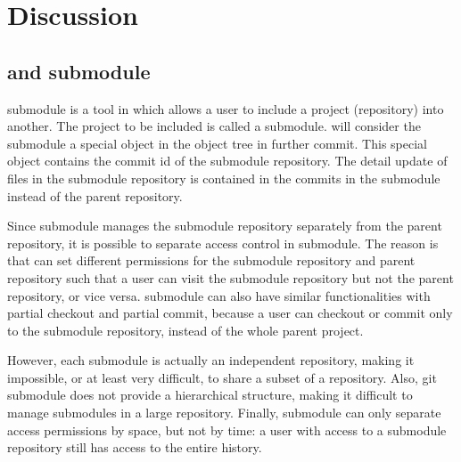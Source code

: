 \section{Discussion}
\label{s:discussion}
\label{s:disc}

\subsection{\Sys and \git submodule}
\Git submodule is a tool in \git which
allows a user to include a project (repository) into another. The project to be included
is called a submodule. \Git will consider the submodule a special object in the
object tree in further commit. This special object contains the commit id of the
submodule repository. The detail update of files in the submodule repository is
contained in the commits in the submodule instead of the parent repository.

Since \git submodule manages the submodule repository separately from the parent repository,
it is possible to separate access control in \git submodule. The reason is that
\git can set different permissions for the submodule repository and parent
repository such that a user can visit the submodule repository but not the parent repository,
or vice versa. \Git submodule can also have similar functionalities with partial
checkout and partial commit, because a user can checkout or commit only to the
submodule repository, instead of the whole parent project.


However, 
each submodule is actually an independent \git
repository, making it impossible, or at least very difficult, to share a subset
of a repository. 
Also,
git submodule
does not
provide a hierarchical structure, making it difficult to manage submodules
in a large repository.
Finally, \git submodule can only separate %
access permissions by space, but not by time: a user with access to a submodule
repository still has
access to the entire history.

\iffalse
\subsection{\Sys and \git access management tools}
\fi

